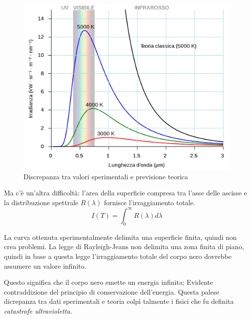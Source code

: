 \documentclass[12pt,twoside]{report}
\begin{document}
\begin{figure}[!h]
\centering
\includegraphics[width = 0.6\hsize]{./figures/catUltravioletta}
\caption{Discrepanza tra valori sperimentali e previsione teorica}
\label{fig:logo}
\end{figure}
\par{Ma c’è un’altra difficoltà: l’area della superficie compresa tra l’asse delle ascisse e la distribuzione spettrale $R(\lambda)$ fornisce l'irraggiamento totale.
$$ I(T) = \int_{0}^{\infty}{R(\lambda)d\lambda} $$
}
\par{La curva ottenuta sperimentalmente delimita una superficie finita, quindi non crea problemi. La legge di Rayleigh-Jeans non delimita una zona finita di piano, quindi in base a questa legge l’irraggiamento totale del corpo nero dovrebbe assumere un valore infinito.}
\par{Questo significa che il corpo nero emette un energia infinita; Evidente contraddizione del principio di conservazione dell’energia.
Questa palese dicrepanza tra dati sperimentali e teoria colpì talmente i fisici che fu definita \textit{catastrofe ultravioletta}.}
\end{document}
